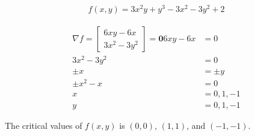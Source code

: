 \begin{align*}
    f(x, y) = 3x^2y + y^3 - 3x^2 - 3y^2 + 2
\end{align*}

\begin{solution}
\begin{align*}
    \nabla f = \begin{bmatrix}
        6xy - 6x \\
        3x^2 - 3y^2
    \end{bmatrix} = \boldsymbol{0}
    6xy - 6x &= 0 \\
    3x^2 - 3y^2 &= 0 \\
    \pm x &= \pm y \\
    \pm x^2 - x &= 0 \\
    x &= 0, 1, -1 \\
    y &= 0, 1, -1
\end{align*}

The critical values of $f(x, y)$ is $(0, 0)$, $(1, 1)$, and $(-1, -1)$.
\end{solution}
